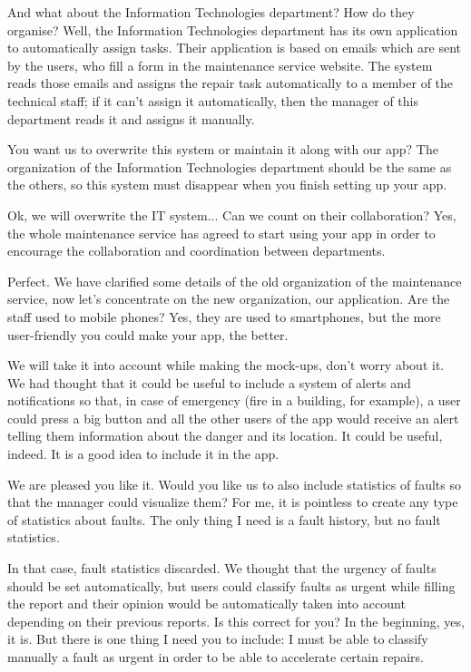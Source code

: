 \ts And what about the Information Technologies department? How do they organise?
\rs Well, the Information Technologies department has its own application to automatically assign tasks. Their application is based on emails which are sent by the users, who fill a form in the maintenance service website. The system reads those emails and assigns the repair task automatically to a member of the technical staff; if it can't assign it automatically, then the manager of this department reads it and assigns it manually.

\ts You want us to overwrite this system or maintain it along with our app?
\rs The organization of the Information Technologies department should be the same as the others, so this system must disappear when you finish setting up your app.

\ts Ok, we will overwrite the IT system... Can we count on their collaboration?
\rs Yes, the whole maintenance service has agreed to start using your app in order to encourage the collaboration and coordination between departments.

\ts Perfect. We have clarified some details of the old organization of the maintenance service, now let's concentrate on the new organization, our application. Are the staff used to mobile phones?
\rs Yes, they are used to smartphones, but the more user-friendly you could make your app, the better.

\ts We will take it into account while making the mock-ups, don't worry about it. We had thought that it could be useful to include a system of alerts and notifications so that, in case of emergency (fire in a building, for example), a user could press a big button and all the other users of the app would receive an alert telling them information about the danger and its location.
\rs It could be useful, indeed. It is a good idea to include it in the app.

\ts We are pleased you like it. Would you like us to also include statistics of faults so that the manager could visualize them?
\rs For me, it is pointless to create any type of statistics about faults. The only thing I need is a fault history, but no fault statistics.

\ts In that case, fault statistics discarded. We thought that the urgency of faults should be set automatically, but users could classify faults as urgent while filling the report and their opinion would be automatically taken into account depending on their previous reports. Is this correct for you?
\rs In the beginning, yes, it is. But there is one thing I need you to include: I must be able to classify manually a fault as urgent in order to be able to accelerate certain repairs.

